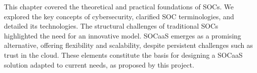 This chapter covered the theoretical and practical foundations of SOCs. We explored the key concepts of cybersecurity, clarified SOC terminologies, and detailed its technologies. The structural challenges of traditional SOCs highlighted the need for an innovative model. SOCaaS emerges as a promising alternative, offering flexibility and scalability, despite persistent challenges such as trust in the cloud. These elements constitute the basis for designing a SOCaaS solution adapted to current needs, as proposed by this project.

